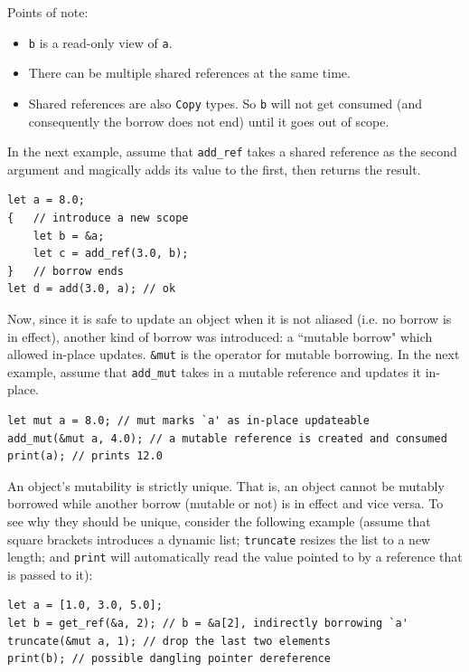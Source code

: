 \documentclass[11pt]{report}
\begin{document}
\newpage

\noindent Points of note:
\begin{itemize}
\item \texttt{b} is a read-only view of \texttt{a}.
\item There can be multiple shared references at the same time.
\item Shared references are also \texttt{Copy} types. So \texttt{b} will not get consumed (and consequently the borrow does not end) until it goes out of scope.
\end{itemize}

In the next example, assume that \texttt{add\_ref} takes a shared reference as the second argument and magically adds its value to the first, then returns the result.

\begin{lstlisting}
let a = 8.0;
{   // introduce a new scope
    let b = &a;
    let c = add_ref(3.0, b);
}   // borrow ends
let d = add(3.0, a); // ok
\end{lstlisting}

Now, since it is safe to update an object when it is not aliased (i.e. no borrow is in effect), another kind of borrow was introduced: a ``mutable borrow" which allowed in-place updates. \texttt{\&mut} is the operator for mutable borrowing. In the next example, assume that \texttt{add\_mut} takes in a mutable reference and updates it in-place.

\begin{lstlisting}
let mut a = 8.0; // mut marks `a' as in-place updateable
add_mut(&mut a, 4.0); // a mutable reference is created and consumed
print(a); // prints 12.0
\end{lstlisting}

An object's mutability is strictly unique. That is, an object cannot be mutably borrowed while another borrow (mutable or not) is in effect and vice versa. To see why they should be unique, consider the following example (assume that square brackets introduces a dynamic list; \texttt{truncate} resizes the list to a new length; and \texttt{print} will automatically read the value pointed to by a reference that is passed to it):

\begin{lstlisting}
let a = [1.0, 3.0, 5.0];
let b = get_ref(&a, 2); // b = &a[2], indirectly borrowing `a'
truncate(&mut a, 1); // drop the last two elements
print(b); // possible dangling pointer dereference
\end{lstlisting}
\end{document}
